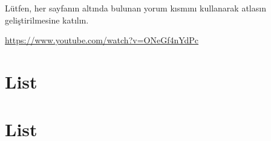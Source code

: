 \documentclass[
  letterpaper,
  DIV=11,
  numbers=noendperiod]{scrreprt}
\begin{document}
\hypertarget{section-7}{%
\chapter{}\label{section-7}}

Lütfen, her sayfanın altında bulunan yorum kısmını kullanarak atlasın
geliştirilmesine katılın.

\url{https://www.youtube.com/watch?v=ONeGf4nYdPc}

\hypertarget{list}{%
\chapter{List}\label{list}}

\hypertarget{list-1}{%
\chapter{List}\label{list-1}}
\end{document}
